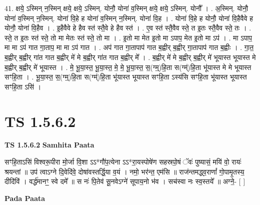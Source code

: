 \documentclass[17pt]{extarticle}
\begin{document}
41. क्षये॒ ऽस्मिन् न॒स्मिन् क्षये॒ क्षये॒ ऽस्मिन्. योनौ॒ योना॑ व॒स्मिन् क्षये॒ क्षये॒ ऽस्मिन्. योनौ᳚ । . अ॒स्मिन्. योनौ॒ योना॑ व॒स्मिन् न॒स्मिन्. योना॑ वि॒हे ह योना॑ व॒स्मिन् न॒स्मिन्. योना॑ वि॒ह । . योना॑ वि॒हे ह योनौ॒ योना॑ वि॒हैवैवे ह योनौ॒ योना॑ वि॒हैव । . इ॒हैवैवे हे हैव स्त॑ स्तै॒वे हे हैव स्त॑ । . ए॒व स्त॑ स्तै॒वैव स्ते॒ त इ॒तः स्तै॒वैव स्ते॒ तः । . स्ते॒ त इ॒तः स्त॑ स्ते॒ तो मा मेतः स्त॑ स्ते॒ तो मा । . इ॒तो मा मेत इ॒तो मा ऽपाप॒ मेत इ॒तो मा ऽप॑ । . मा ऽपाप॒ मा मा ऽप॑ गात गा॒ताप॒ मा मा ऽप॑ गात । . अप॑ गात गा॒तापाप॑ गात ब॒ह्वीर् ब॒ह्वीर् गा॒तापाप॑ गात ब॒ह्वीः । . गा॒त॒ ब॒ह्वीर् ब॒ह्वीर् गा॑त गात ब॒ह्वीर् मे॑ मे ब॒ह्वीर् गा॑त गात ब॒ह्वीर् मे᳚ । . ब॒ह्वीर् मे॑ मे ब॒ह्वीर् ब॒ह्वीर् मे॑ भूयास्त भूयास्त मे ब॒ह्वीर् ब॒ह्वीर् मे॑ भूयास्त । . मे॒ भू॒या॒स्त॒ भू॒या॒स्त॒ मे॒ मे॒ भू॒या॒स्त॒ स॒(ग्म्॒)हि॒ता स(ग्म्॑)हि॒ता भू॑यास्त मे मे भूयास्त सꣳहि॒ता । . भू॒या॒स्त॒ स॒(ग्म्॒)हि॒ता स(ग्म्॑)हि॒ता भू॑यास्त भूयास्त सꣳहि॒ता ऽस्य॑सि सꣳहि॒ता भू॑यास्त भूयास्त सꣳहि॒ता ऽसि॑ । \newline
\pagebreak
{}
\section*{ TS 1.5.6.2 }

\textbf{TS 1.5.6.2 } \newline
\textbf{Samhita Paata} \newline

सꣳहि॒ताऽसि॑ विश्वरू॒पीरा मो॒र्जा वि॒शा ऽऽ*गौ॑प॒त्येना ऽऽ*रा॒यस्पोषे॑ण सहस्रपो॒षं ॅवः॑ पुष्यासं॒ मयि॑ वो॒ रायः॑ श्रयन्तां ॥ उप॑ त्वाऽग्ने दि॒वेदि॑वे॒ दोषा॑वस्तर्द्धि॒या व॒यं । नमो॒ भर॑न्त॒ एम॑सि ॥ राज॑न्तमद्ध्व॒राणां᳚ गो॒पामृ॒तस्य॒ दीदि॑विं । वर्द्ध॑मानꣳ॒॒ स्वे दमे᳚ ॥ स नः॑ पि॒तेव॑ सू॒नवेऽग्ने॑ सूपाय॒नो भ॑व । सच॑स्वा नः स्व॒स्तये᳚ ॥ अग्ने॒- [ ] \newline

\textbf{Pada Paata} \newline
\end{document}
